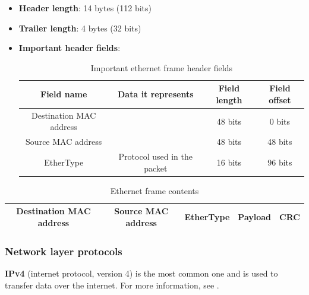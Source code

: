 \documentclass[a4paper]{article}
\begin{document}
  \begin{itemize}
    \item \textbf{Header length}: 14 bytes (112 bits)
    \item \textbf{Trailer length}: 4 bytes (32 bits)
    \item \textbf{Important header fields}:
      \begin{table}[h]
        \centering
        \begin{tabular}{|c|c|c|c|}
          \hline
          Field name & Data it represents & Field length & Field offset \\
          \hline
          \hline
          Destination MAC address & & 48 bits & 0 bits \\
          \hline
          Source MAC address & & 48 bits & 48 bits \\
          \hline
          EtherType & Protocol used in the packet & 16 bits & 96 bits \\
          \hline
        \end{tabular}
        \caption{Important ethernet frame header fields}
      \end{table}
  \end{itemize}

  \begin{table}[h]
    \centering
    \begin{tabular}{|c|c|c|c|c|}
      \hline
      Destination MAC address & Source MAC address & EtherType & 
        \textbf{Payload} & CRC \\
      \hline
    \end{tabular}
    \caption{Ethernet frame contents}
    \label{ethernet_frame}
  \end{table}

  \vspace{1cm}


  \subsubsection{Network layer protocols}

  \textbf{IPv4} (internet protocol, version 4) is the most common one and is 
  used to transfer data over the internet.
  For more information, see \cite{wikipedia:ipv4}.
\end{document}
